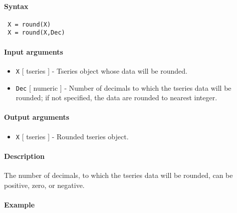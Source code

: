 


	\paragraph{Syntax}
 
 \begin{verbatim}
 X = round(X)
 X = round(X,Dec)
 \end{verbatim}
 
 \paragraph{Input arguments}
 
 \begin{itemize}
 \item
   \texttt{X} {[} tseries {]} - Tseries object whose data will be
   rounded.
 \item
   \texttt{Dec} {[} numeric {]} - Number of decimals to which the tseries
   data will be rounded; if not specified, the data are rounded to
   nearest integer.
 \end{itemize}
 
 \paragraph{Output arguments}
 
 \begin{itemize}
 \item
   \texttt{X} {[} tseries {]} - Rounded tseries object.
 \end{itemize}
 
 \paragraph{Description}
 
 The number of decimals, to which the tseries data will be rounded, can
 be positive, zero, or negative.
 
 \paragraph{Example}


